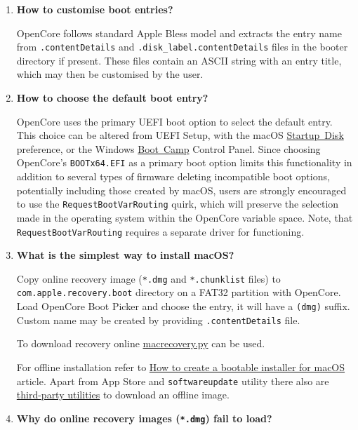 \documentclass[]{article}
\begin{document}
\begin{enumerate}
\item
  \textbf{How to customise boot entries?}

  OpenCore follows standard Apple Bless model and extracts the entry name
  from \texttt{.contentDetails} and \texttt{.disk\_label.contentDetails} files in the
  booter directory if present. These files contain an ASCII string with an entry title,
  which may then be customised by the user.

\item
  \textbf{How to choose the default boot entry?}

  OpenCore uses the primary UEFI boot option to select the default entry. This choice
  can be altered from UEFI Setup, with the macOS
  \href{https://support.apple.com/HT202796}{Startup Disk} preference, or the Windows
  \href{https://support.apple.com/guide/bootcamp-control-panel/start-up-your-mac-in-windows-or-macos-bcmp29b8ac66/mac}{Boot Camp} Control Panel.
  Since choosing OpenCore's \texttt{BOOTx64.EFI} as a primary boot option limits this
  functionality in addition to several types of firmware deleting incompatible boot options,
  potentially including those created by macOS, users are strongly encouraged to use the
  \texttt{RequestBootVarRouting} quirk, which will preserve the selection made in
  the operating system within the OpenCore variable space. Note, that \texttt{RequestBootVarRouting}
  requires a separate driver for functioning.

\item \label{reinstallmacos}
  \textbf{What is the simplest way to install macOS?}

  Copy online recovery image (\texttt{*.dmg} and \texttt{*.chunklist} files)
  to \texttt{com.apple.recovery.boot} directory on a FAT32 partition with OpenCore.
  Load OpenCore Boot Picker and choose the entry, it will have a \texttt{(dmg)} suffix.
  Custom name may be created by providing \texttt{.contentDetails} file.

  To download recovery online
  \href{https://github.com/acidanthera/OpenCorePkg/blob/master/Utilities/macrecovery/macrecovery.py}{macrecovery.py}
  can be used.

  For offline installation refer to
  \href{https://support.apple.com/HT201372}{How to create a bootable installer for macOS}
  article. Apart from App Store and \texttt{softwareupdate} utility there also are
  \href{https://github.com/corpnewt/gibMacOS}{third-party utilities} to download an offline image.

\item
  \textbf{Why do online recovery images (\texttt{*.dmg}) fail to load?}


\end{enumerate}
\end{document}
